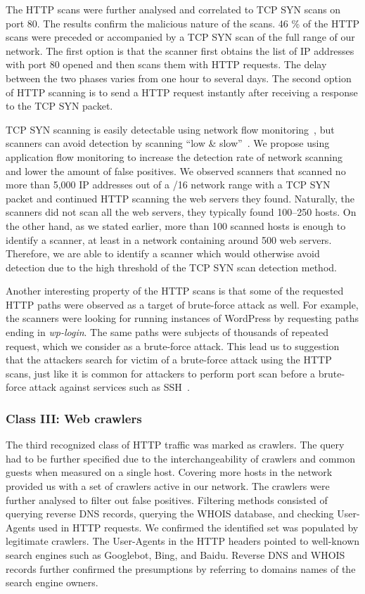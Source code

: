 The HTTP scans were further analysed and correlated to TCP SYN scans on port 80. The results confirm the malicious nature of the scans. 46 \% of the HTTP scans were preceded or accompanied by a TCP SYN scan of the full range of our network. The first option is that the scanner first obtains the list of IP addresses with port 80 opened and then scans them with HTTP requests. The delay between the two phases varies from one hour to several days. The second option of HTTP scanning is to send a HTTP request instantly after receiving a response to the TCP SYN packet.

TCP SYN scanning is easily detectable using network flow monitoring~\cite{Sperotto-2010-Overview}, but scanners can avoid detection by scanning ``low \& slow''~\cite{Kang-2007-Distributed}. We propose using application flow monitoring to increase the detection rate of network scanning and lower the amount of false positives. We observed scanners that scanned no more than 5,000 IP addresses out of a /16 network range with a TCP SYN packet and continued HTTP scanning the web servers they found. Naturally, the scanners did not scan all the web servers, they typically found 100--250 hosts. On the other hand, as we stated earlier, more than 100 scanned hosts is enough to identify a scanner, at least in a network containing around 500 web servers. Therefore, we are able to identify a scanner which would otherwise avoid detection due to the high threshold of the TCP SYN scan detection method.

Another interesting property of the HTTP scans is that some of the requested HTTP paths were observed as a target of brute-force attack as well. For example, the scanners were looking for running instances of WordPress by requesting paths ending in \textit{wp-login}. The same paths were subjects of thousands of repeated request, which we consider as a brute-force attack. This lead us to suggestion that the attackers search for victim of a brute-force attack using the HTTP scans, just like it is common for attackers to perform port scan before a brute-force attack against services such as SSH~\cite{Vykopal-2013-Flow}.

\subsubsection{Class III: Web crawlers}

The third recognized class of HTTP traffic was marked as crawlers. The query had to be further specified due to the interchangeability of crawlers and common guests when measured on a single host. Covering more hosts in the network provided us with a set of crawlers active in our network. The crawlers were further analysed to filter out false positives. Filtering methods consisted of querying reverse DNS records, querying the WHOIS database, and checking User-Agents used in HTTP requests. We confirmed the identified set was populated by legitimate crawlers. The User-Agents in the HTTP headers pointed to well-known search engines such as Googlebot, Bing, and Baidu. Reverse DNS and WHOIS records further confirmed the presumptions by referring to domains names of the search engine owners.

